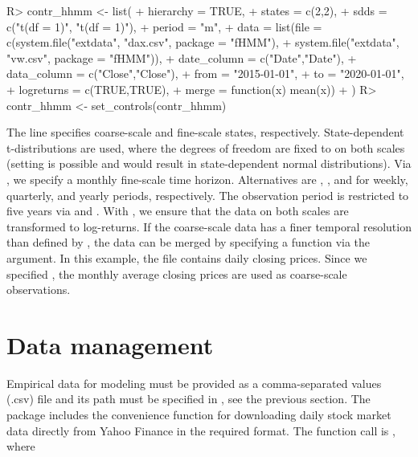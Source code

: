 \documentclass[article]{jss}
\newcommand{\fct}[1]{\code{#1()}}
\begin{document}
%
\begin{Schunk}
\begin{Sinput}
R> contr_hhmm <- list(
+    hierarchy = TRUE,
+    states    = c(2,2),
+    sdds      = c("t(df = 1)", "t(df = 1)"),
+    period    = "m",
+    data      = list(file = c(system.file("extdata", "dax.csv", package = "fHMM"),
+                              system.file("extdata", "vw.csv", package = "fHMM")),
+                     date_column = c("Date","Date"),
+                     data_column = c("Close","Close"),
+                     from = "2015-01-01",
+                     to = "2020-01-01",
+                     logreturns = c(TRUE,TRUE),
+                     merge = function(x) mean(x))
+  )
R> contr_hhmm <- set_controls(contr_hhmm)
\end{Sinput}
\end{Schunk}
%

The line  specifies  coarse-scale and  fine-scale states, respectively. State-dependent t-distributions are used, where the degrees of freedom are fixed to  on both scales (setting  is possible and would result in state-dependent normal distributions). Via , we specify a monthly fine-scale time horizon. Alternatives are , , and  for weekly, quarterly, and yearly periods, respectively. The observation period is restricted to five years via  and . With , we ensure that the data on both scales are transformed to log-returns. If the coarse-scale data has a finer temporal resolution than defined by , the data can be merged by specifying a function via the  argument. In this example, the file  contains daily closing prices. Since we specified , the monthly average closing prices are used as coarse-scale observations.

\section{Data management} \label{sec:data_management} %

Empirical data for modeling must be provided as a comma-separated values (.csv) file and its path must be specified in \fct{set\_controls}, see the previous section. The package includes the convenience function \fct{download\_data} for downloading daily stock market data directly from Yahoo Finance in the required format. The function call is , where
\end{document}
